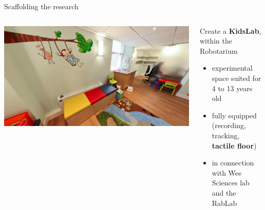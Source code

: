 \documentclass[compress]{beamer}
\begin{document}

\begin{frame}{Scaffolding the research}

    \begin{columns}
        \begin{column}{0.4\linewidth}
            \begin{center}
                \includegraphics[width=\linewidth]{edinburgh/rablab}
                \vspace{2em}

            \end{center}
        \end{column}
        \begin{column}{0.6\linewidth}

            Create a \textbf{KidsLab}, within the Robotarium
                \begin{itemize}
                    \item experimental space suited for 4 to 13 years old
                    \item fully equipped (recording, tracking, \textbf{tactile
                        floor})
                    \item in connection with Wee Sciences lab and the RabLab
                \end{itemize}


\end{column}
\end{columns}
\end{frame}
\end{document}

